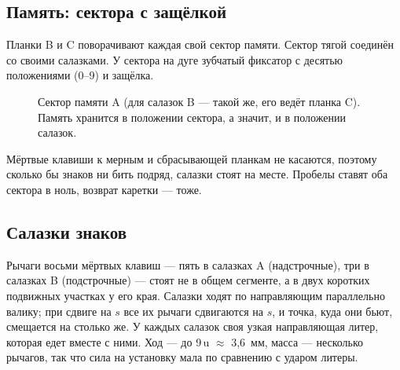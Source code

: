 \subsection{Память: сектора с защёлкой}

Планки B и C поворачивают каждая свой сектор памяти. Сектор тягой соединён со своими салазками. У сектора на дуге зубчатый фиксатор с десятью положениями (0--9) и защёлка.

\begin{figure}[h]
\centering
{}
\caption{Сектор памяти A (для салазок B — такой же, его ведёт планка C). Память хранится в положении сектора, а значит, и в положении салазок.}
\label{fig:mem}
\end{figure}

Мёртвые клавиши к мерным и сбрасывающей планкам не касаются, поэтому сколько бы знаков ни бить подряд, салазки стоят на месте. Пробелы ставят оба сектора в ноль, возврат каретки — тоже.

\subsection{Салазки знаков}

Рычаги восьми мёртвых клавиш — пять в салазках A (надстрочные), три в салазках B (подстрочные) — стоят не в общем сегменте, а в двух коротких подвижных участках у его края. Салазки ходят по направляющим параллельно валику; при сдвиге на $s$ все их рычаги сдвигаются на $s$, и точка, куда они бьют, смещается на столько же. У каждых салазок своя узкая направляющая литер, которая едет вместе с ними. Ход — до 9\,u $\approx$ 3,6~мм, масса — несколько рычагов, так что сила на установку мала по сравнению с ударом литеры.

